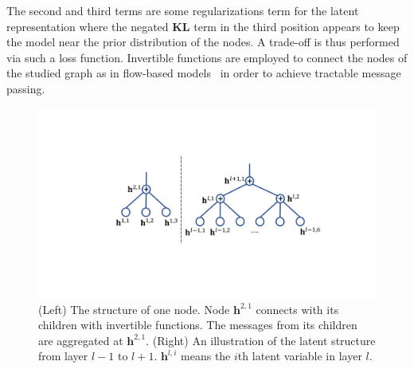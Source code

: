 \documentclass{article} %
\begin{document}
The second and third terms are some regularizations term for the latent representation where the negated \textbf{KL} term in the third position appears to keep the model near the prior distribution of the nodes. 
A trade-off is thus performed via such a loss function.
Invertible functions are employed to connect the nodes of the studied graph as in flow-based models~\citep{Dinh2016DensityEU} in order to achieve tractable message passing. 

\begin{figure}
\vspace{-0.2in}
\begin{center}
 \includegraphics[width=1.0\linewidth]{fig/node.pdf}
\end{center}
\vspace{-0.2in}
\caption{ {\small (Left) The structure of one node. Node $\mathbf{h}^{2, 1}$ connects with its children with invertible functions. The messages from its children are aggregated at $\mathbf{h}^{2,1}$. (Right) An illustration of the latent structure from layer $l-1$ to $l+1$.  
$\mathbf{h}^{l, i}$ means the $i$th latent variable  in layer $l$.}}
\label{fig:node_tree}
\vspace{-0.15in}
\end{figure}
\end{document}
